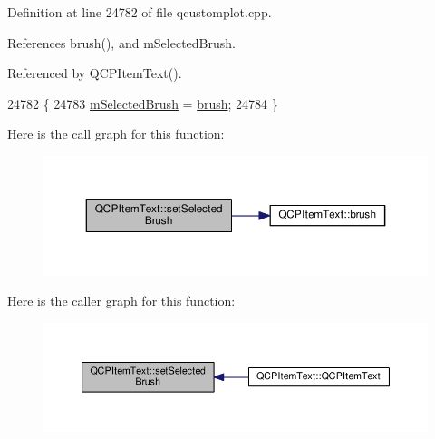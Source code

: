 Definition at line 24782 of file qcustomplot.\+cpp.



References brush(), and m\+Selected\+Brush.



Referenced by Q\+C\+P\+Item\+Text().


\begin{DoxyCode}
24782                                                       \{
24783   \hyperlink{class_q_c_p_item_text_a28ccd097b42a216d81db9c6869f54a59}{mSelectedBrush} = \hyperlink{class_q_c_p_item_text_a38b981dfacb703efa8e27346eebcb5a2}{brush};
24784 \}
\end{DoxyCode}


Here is the call graph for this function\+:\nopagebreak
\begin{figure}[H]
\begin{center}
\leavevmode
\includegraphics[width=350pt]{class_q_c_p_item_text_a6b8377eeb2af75eb9528422671ac16cb_cgraph}
\end{center}
\end{figure}




Here is the caller graph for this function\+:\nopagebreak
\begin{figure}[H]
\begin{center}
\leavevmode
\includegraphics[width=350pt]{class_q_c_p_item_text_a6b8377eeb2af75eb9528422671ac16cb_icgraph}
\end{center}
\end{figure}


\hypertarget{class_q_c_p_item_text_ae7ba0bdb75c897b028388e45bfd435fa}{}
